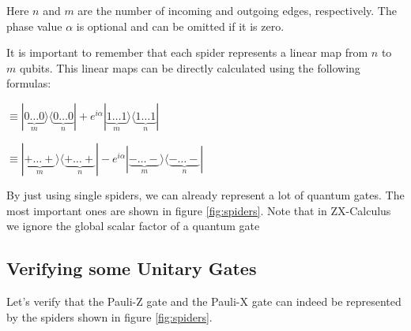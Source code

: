 \documentclass[conference]{IEEEtran}
\begin{document}
\vspace{5pt}
\begin{ZX}
      \zxZ{\alpha} 
\end{ZX}

\vspace{5pt}


\begin{ZX}
      \zxX{\alpha} 
\end{ZX}
\vspace{5pt}


Here $n$ and $m$ are the number of incoming and outgoing edges, respectively. The phase value $\alpha$ is optional and can be omitted if it is zero.

It is important to remember that each spider represents a linear map from $n$ to $m$ qubits. This linear maps can be directly calculated using the following formulas:

\vspace{5pt}
 $\equiv |\underbrace{0\dots 0}_{m}\rangle \langle \underbrace{0\dots0}_{n}| + e^{i\alpha}|\underbrace{1\dots1}_{m}\rangle \langle \underbrace{1\dots1}_{n}|$

\vspace{5pt}
\begin{ZX}
      \zxZ{\alpha} 
\end{ZX} $\equiv |\underbrace{+\dots +}_{m}\rangle \langle \underbrace{+\dots+}_{n}| - e^{i\alpha}|\underbrace{-\dots-}_{m}\rangle \langle \underbrace{-\dots-}_{n}|$
\vspace{5pt}

By just using single spiders, we can already represent a lot of quantum gates. The most important ones are shown in figure \ref{fig:spiders}. Note that in ZX-Calculus we ignore the global scalar factor of a quantum gate

\subsection*{Verifying some Unitary Gates}

Let's verify that the Pauli-Z gate and the Pauli-X gate can indeed be represented by the spiders shown in figure \ref{fig:spiders}.
\end{document}
